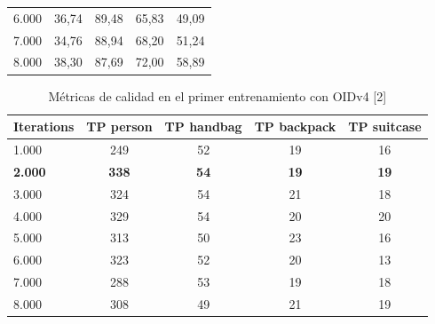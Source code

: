 \begin{table}[ht]
\begin{tabular}{lcccc}
6.000               & 36,74                                                             & 89,48                                                              & 65,83                                                               & 49,09                                                               \\
7.000               & 34,76                                                             & 88,94                                                              & 68,20                                                               & 51,24                                                               \\
8.000               & 38,30                                                             & 87,69                                                              & 72,00                                                               & 58,89                                                               \\ \hline
\end{tabular}
\end{table}

\newpage

\begin{table}[ht]
\centering
\caption{Métricas de calidad en el primer entrenamiento con OIDv4 [2]}
\label{tab:metricas-test1_2}
\begin{tabular}{lcccc}
\hline
\textbf{Iterations} & \textbf{TP person} & \textbf{TP handbag} & \textbf{TP backpack} & \textbf{TP suitcase} \\ \hline
1.000               & 249                & 52                  & 19                   & 16                   \\
\textbf{2.000}      & \textbf{338}       & \textbf{54}         & \textbf{19}          & \textbf{19}          \\
3.000               & 324                & 54                  & 21                   & 18                   \\
4.000               & 329                & 54                  & 20                   & 20                   \\
5.000               & 313                & 50                  & 23                   & 16                   \\
6.000               & 323                & 52                  & 20                   & 13                   \\
7.000               & 288                & 53                  & 19                   & 18                   \\
8.000               & 308                & 49                  & 21                   & 19                   \\ \hline
\end{tabular}
\end{table}

